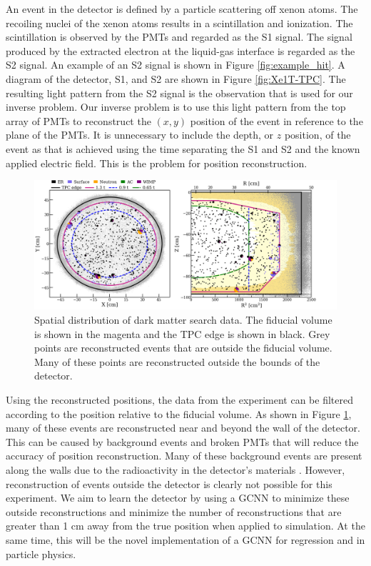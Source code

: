 \documentclass[../thesis.tex]{subfiles}
\begin{document}
\par An event in the detector is defined by a particle scattering off xenon atoms.
The recoiling nuclei of the xenon atoms results in a scintillation and ionization.
The scintillation is observed by the PMTs and regarded as the S1 signal.
The signal produced by the extracted electron at the liquid-gas interface is regarded as the S2 signal.
An example of an S2 signal is shown in Figure \ref{fig:example_hit}.
A diagram of the detector, S1, and S2 are shown in Figure \ref{fig:Xe1T-TPC}.
The resulting light pattern from the S2 signal is the observation that is used for our inverse problem.
Our inverse problem is to use this light pattern from the top array of PMTs to reconstruct the $(x, y)$ position of the event in reference to the plane of the PMTs.
It is unnecessary to include the depth, or $z$ position, of the event as that is achieved using the time separating the S1 and S2 and the known applied electric field.
This is the problem for position reconstruction.

\begin{figure}[t]
	\centering
	\includegraphics[width=\linewidth]{figures/reconstruction_distribution.png}
	\caption{
	Spatial distribution of dark matter search data.
	The fiducial volume is shown in the magenta and the TPC edge is shown in black.
	Grey points are reconstructed events that are outside the fiducial volume.
	Many of these points are reconstructed outside the bounds of the detector.
	\cite{Xe1T-YearExpo}
	}
	\label{fig:reco-distro}
\end{figure}
\par Using the reconstructed positions, the data from the experiment can be filtered according to the position relative to the fiducial volume.
As shown in Figure \ref{fig:reco-distro}, many of these events are reconstructed near and beyond the wall of the detector.
This can be caused by background events and broken PMTs that will reduce the accuracy of position reconstruction.
Many of these background events are present along the walls due to the radioactivity in the detector's materials \cite{Xe1T-YearExpo}.
However, reconstruction of events outside the detector is clearly not possible for this experiment.
We aim to learn the detector by using a GCNN to minimize these outside reconstructions and minimize the number of reconstructions that are greater than 1 cm away from the true position when applied to simulation.
At the same time, this will be the novel implementation of a GCNN for regression and in particle physics.
\end{document}
